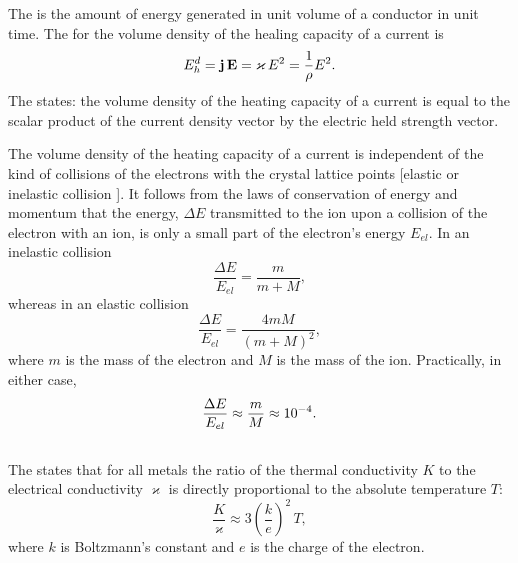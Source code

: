 The  is the
amount of energy generated in unit volume of a conductor in unit time. The  for the volume density of the healing capacity of a current is
\begin{equation*}%
E_{h}^{d} = \vb{j}\, \vb{E} = \varkappa \, E^{2} = \frac{1}{\rho} E^{2}.
\end{equation*}
The  states: the volume density of the heating capacity of a current is equal to the scalar product of the current density vector by the electric held strength vector.

The volume density of the heating capacity of a current is independent of the kind of collisions of the electrons with the crystal lattice points [elastic or inelastic collision ]. It follows from the laws of conservation of energy and momentum that the energy, $\Delta E$ transmitted to the ion upon a collision of the electron with an ion, is only a small part of the electron's energy $E_{el}$. In an inelastic collision 
\begin{equation*}%
\frac{\Delta E}{E_{el}} = \frac{m}{m + M},
\end{equation*}
whereas in an elastic collision 
\begin{equation*}%
\frac{\Delta E}{E_{el}} = \frac{4mM}{(m + M)^{2}},
\end{equation*}
where $m$ is the mass of the electron and $M$ is the mass of the ion. Practically, in either case,
\begin{equation*}%
\frac{\Delta E}{E_{el}} \approx \frac{m}{M} \approx \num{d-4}.
\end{equation*}

\subsection{}\label{20.3.6} The  states that for all metals the ratio of the thermal conductivity $K$  to the electrical conductivity $\varkappa$ is directly proportional to the absolute temperature $T$:
\begin{equation*}%
\frac{K}{\varkappa} \approx 3 \left( \frac{k}{e}\right)^{2} \, T,
\end{equation*}
where $k$ is Boltzmann's constant  and $e$ is the charge of the electron.

